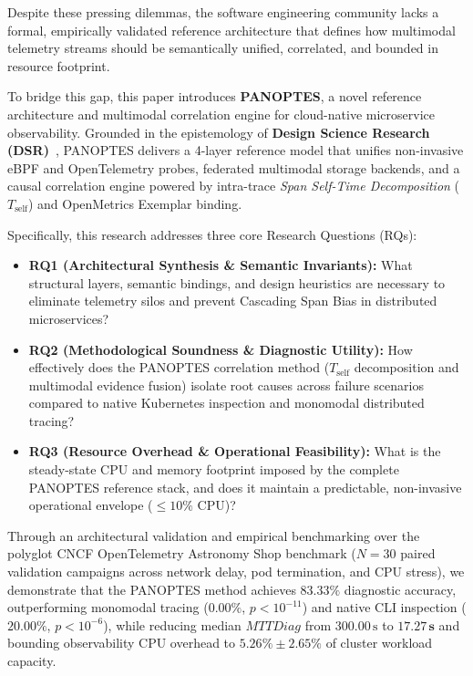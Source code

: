 Despite these pressing dilemmas, the software engineering community lacks a formal, empirically validated reference architecture that defines how multimodal telemetry streams should be semantically unified, correlated, and bounded in resource footprint. 

To bridge this gap, this paper introduces \textbf{PANOPTES}, a novel reference architecture and multimodal correlation engine for cloud-native microservice observability. Grounded in the epistemology of \textbf{Design Science Research (DSR)}~\cite{simon_1969, hevner_2004, peffers_2007}, PANOPTES delivers a 4-layer reference model that unifies non-invasive eBPF and OpenTelemetry probes, federated multimodal storage backends, and a causal correlation engine powered by intra-trace \textit{Span Self-Time Decomposition} ($T_{\text{self}}$) and OpenMetrics Exemplar binding.

Specifically, this research addresses three core Research Questions (RQs):
\begin{itemize}[leftmargin=1.2em, itemsep=2pt, topsep=3pt]
    \item \textbf{RQ1 (Architectural Synthesis \& Semantic Invariants):} What structural layers, semantic bindings, and design heuristics are necessary to eliminate telemetry silos and prevent Cascading Span Bias in distributed microservices?
    \item \textbf{RQ2 (Methodological Soundness \& Diagnostic Utility):} How effectively does the PANOPTES correlation method ($T_{\text{self}}$ decomposition and multimodal evidence fusion) isolate root causes across failure scenarios compared to native Kubernetes inspection and monomodal distributed tracing?
    \item \textbf{RQ3 (Resource Overhead \& Operational Feasibility):} What is the steady-state CPU and memory footprint imposed by the complete PANOPTES reference stack, and does it maintain a predictable, non-invasive operational envelope ($\le 10\%$ CPU)?
\end{itemize}

Through an architectural validation and empirical benchmarking over the polyglot CNCF OpenTelemetry Astronomy Shop benchmark ($N=30$ paired validation campaigns across network delay, pod termination, and CPU stress), we demonstrate that the PANOPTES method achieves $\mathbf{83.33\%}$ diagnostic accuracy, outperforming monomodal tracing ($0.00\%$, $p < 10^{-11}$) and native CLI inspection ($20.00\%$, $p < 10^{-6}$), while reducing median $MTTDiag$ from $300.00\,\text{s}$ to $\mathbf{17.27\,\text{s}}$ and bounding observability CPU overhead to $5.26\% \pm 2.65\%$ of cluster workload capacity.
